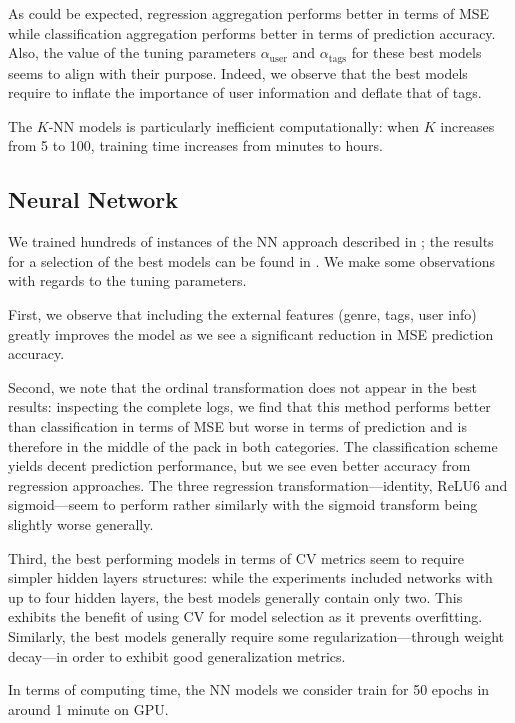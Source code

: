 \documentclass[bj, preprint]{imsart}
\begin{document}
As could be expected, regression aggregation performs better in terms of MSE while classification aggregation performs better in terms of prediction accuracy. Also, the value of the tuning parameters $\alpha_\text{user}$ and $\alpha_\text{tags}$ for these best models seems to align with their purpose. Indeed, we observe that the best models require to inflate the importance of user information and deflate that of tags.

The  $K$-NN models is particularly inefficient computationally: when $K$ increases from 5 to 100, training time increases from minutes to hours.


\subsection{Neural Network}\label{sebsec:results.nn}

We trained hundreds of instances of the NN approach described in ; the results for a selection of the best models can be found in . We make some observations with regards to the tuning parameters.

First, we observe that including the external features (genre, tags, user info) greatly improves the model as we see a significant reduction in MSE prediction accuracy. 

Second, we note that the ordinal transformation does not appear in the best results: inspecting the complete logs, we find that this method performs better than classification in terms of MSE but worse in terms of prediction and is therefore in the middle of the pack in both categories. The classification scheme yields decent prediction performance, but we see even better accuracy from regression approaches. The three regression transformation---identity, ReLU6 and sigmoid---seem to perform rather similarly with the sigmoid transform being slightly worse generally.

Third, the best performing models in terms of CV metrics seem to require simpler hidden layers structures: while the experiments included networks with up to four hidden layers, the best models generally contain only two. This exhibits the benefit of using CV for model selection as it prevents overfitting. Similarly, the best models generally require some regularization---through weight decay---in order to exhibit good generalization metrics.

In terms of computing time, the NN models we consider train for 50 epochs in around 1 minute on GPU.
\end{document}
